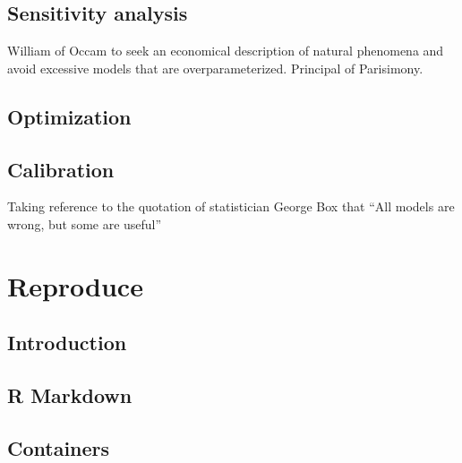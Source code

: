 \documentclass[
]{book}
\begin{document}
\hypertarget{sensitivity-analysis}{%
\chapter{Sensitivity analysis}\label{sensitivity-analysis}}

William of Occam to seek an economical description of natural phenomena and avoid excessive models that are overparameterized. Principal of Parisimony.

\hypertarget{optimization}{%
\chapter{Optimization}\label{optimization}}

\hypertarget{calibration}{%
\chapter{Calibration}\label{calibration}}

Taking reference to the quotation of statistician George Box that ``All models are wrong, but some are useful''

\hypertarget{part-reproduce}{%
\part{Reproduce}\label{part-reproduce}}

\hypertarget{reproduce}{%
\chapter{Introduction}\label{reproduce}}

\hypertarget{r-markdown}{%
\chapter{R Markdown}\label{r-markdown}}

\hypertarget{containers}{%
\chapter{Containers}\label{containers}}

  
\end{document}
